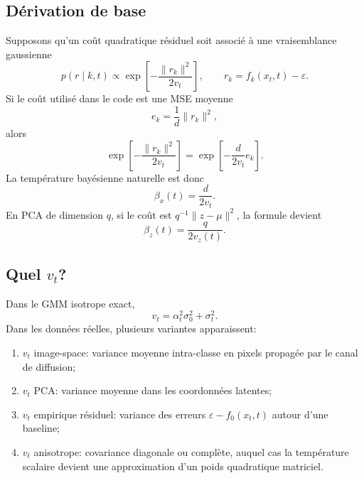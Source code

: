 \documentclass[11pt,a4paper]{article}
\newcommand{\1}{\mathbf{1}}
\newcommand{\eps}{\varepsilon}
\newcommand{\xt}{x_t}
\begin{document}
\subsection{Dérivation de base}

Supposons qu'un coût quadratique résiduel soit associé à une vraisemblance gaussienne
\begin{equation}
 p(r\mid k,t)\propto\exp\left[-\frac{\|r_k\|^2}{2v_t}\right],
\qquad
r_k=f_k(\xt,t)-\eps.
\label{eq:gauss_likelihood_r}
\end{equation}
Si le coût utilisé dans le code est une MSE moyenne
\begin{equation}
 e_k=\frac1d\|r_k\|^2,
\end{equation}
alors
\begin{equation}
\exp\left[-\frac{\|r_k\|^2}{2v_t}\right]
=\exp\left[-\frac{d}{2v_t}e_k\right].
\end{equation}
La température bayésienne naturelle est donc
\begin{equation}
\boxed{
\beta_x(t)=\frac{d}{2v_t}.
}
\label{eq:beta_x}
\end{equation}
En PCA de dimension $q$, si le coût est $q^{-1}\|z-\mu\|^2$, la formule devient
\begin{equation}
\boxed{
\beta_z(t)=\frac{q}{2v_z(t)}.
}
\label{eq:beta_z}
\end{equation}

\subsection{Quel $v_t$?}

Dans le GMM isotrope exact,
\begin{equation}
 v_t=\alpha_t^2\sigma_0^2+\sigma_t^2.
\end{equation}
Dans les données réelles, plusieurs variantes apparaissent:
\begin{enumerate}[leftmargin=2em]
\item $v_t$ image-space: variance moyenne intra-classe en pixels propagée par le canal de diffusion;
\item $v_t$ PCA: variance moyenne dans les coordonnées latentes;
\item $v_t$ empirique résiduel: variance des erreurs $\eps-f_0(\xt,t)$ autour d'une baseline;
\item $v_t$ anisotrope: covariance diagonale ou complète, auquel cas la température scalaire devient une approximation d'un poids quadratique matriciel.
\end{enumerate}
\end{document}
